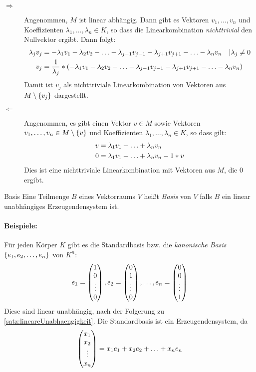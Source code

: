 \begin{description}
  \newcommand{\lv}[1]{\ensuremath\lambda_{#1}v_{#1}}
  \item[\glqq$\Rightarrow$\grqq] Angenommen, $M$ ist linear abhängig. Dann gibt es Vektoren $v_1,\ldots,v_n$ und Koeffizienten $\lambda_1,\ldots,\lambda_n \in K$, so dass die Linearkombination \emph{nichttrivial} den Nullvektor ergibt. Dann folgt:
  \begin{align*}
    \lv{j} &= -\lv{1}-\lv{2}-\ldots-\lv{j-1}-\lv{j+1}-\ldots-\lv{n} \quad |\lambda_j\neq0\\
    v_j &= \frac{1}{\lambda_j} * \left( -\lv{1}-\lv{2}-\ldots-\lv{j-1}-\lv{j+1}-\ldots-\lv{n} \right)
  \end{align*}
  Damit ist $v_j$ als nichttriviale Linearkombination von Vektoren aus $M\setminus\left\{ v_j \right\}$ dargestellt.


  \item[\glqq$\Leftarrow$\grqq] Angenommen, es gibt einen Vektor $v\in M$ sowie Vektoren $v_1,\ldots,v_n\in M\setminus\left\{ v \right\}$ und Koeffizienten $\lambda_1,\ldots,\lambda_n \in K$, so dass gilt:
  \begin{align*}
    v &= \lv{1}+\ldots+\lv{n}\\
    0 &= \lv{1}+\ldots+\lv{n} - 1*v
  \end{align*}
  Dies ist eine nichttriviale Linearkombination mit Vektoren aus $M$, die $0$ ergibt.
\end{description}


\begin{definition}{Basis}
	Eine Teilmenge $B$ eines Vektorraums $V$ heißt \emph{Basis} von $V$ falls $B$ ein linear unabhängiges Erzeugendensystem ist.
\end{definition}


\paragraph{Beispiele:}
Für jeden Körper $K$ gibt es die Standardbasis bzw. die \emph{kanonische Basis} $\left\{ e_1,e_2,\ldots,e_n \right\}$ von $K^n$:
\begin{equation*}
  e_1=\vector{1\\0\\\vdots\\ 0}, e_2=\vector{0\\1\\\vdots\\ 0}, \ldots, e_n=\vector{0\\0\\\vdots\\ 1}
\end{equation*}
Diese sind linear unabhängig, nach der Folgerung zu \autoref{satz:lineareUnabhaengigkeit}. Die Standardbasis ist ein Erzeugendensystem, da
\begin{equation*}
  \vector{x_1\\x_2\\\vdots\\x_n}=x_1e_1+x_2e_2+\ldots+x_ne_n
\end{equation*}

